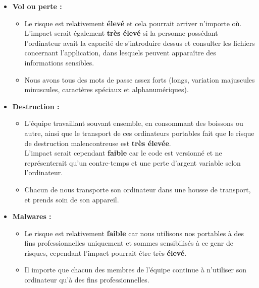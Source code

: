 \documentclass{report}
\begin{document}
			\begin{itemize}
				\item \textbf{Vol ou perte : }\\
					\begin{itemize}
						\item Le risque est relativement \textbf{élevé} et cela pourrait arriver n'importe où.\\ L'impact serait également \textbf{très élevé} si la personne possédant l'ordinateur avait la capacité de s'introduire dessus et consulter les fichiers concernant l'application, dans lesquels peuvent apparaître des informations sensibles.\\
						\item Nous avons tous des mots de passe assez forts (longs, variation majuscules minuscules, caractères spéciaux et alphanumériques).\\
					\end{itemize}

				\item \textbf{Destruction : }\\
					\begin{itemize}
						\item L'équipe travaillant souvant ensemble, en consommant des boissons ou autre, ainsi que le transport de ces ordinateurs portables fait que le risque de destruction malencontreuse est \textbf{très élevée}.\\
						L'impact serait cependant \textbf{faible} car le code est versionné et ne représenterait qu'un contre-temps et une perte d'argent variable selon l'ordinateur.\\
						\item Chacun de nous transporte son ordinateur dans une housse de transport, et prends soin de son appareil.\\
					\end{itemize}

				\item \textbf{Malwares : }\\
					\begin{itemize}
						\item Le risque est relativement \textbf{faible} car nous utilisons nos portables à des fins professionnelles uniquement et sommes sensibilisés à ce genr de risques, cependant l'impact pourrait être très \textbf{élevé}.\\
						\item Il importe que chacun des membres de l'équipe continue à n'utiliser son ordinateur qu'à des fins professionnelles.\\
					\end{itemize}

			\end{itemize}
\end{document}
